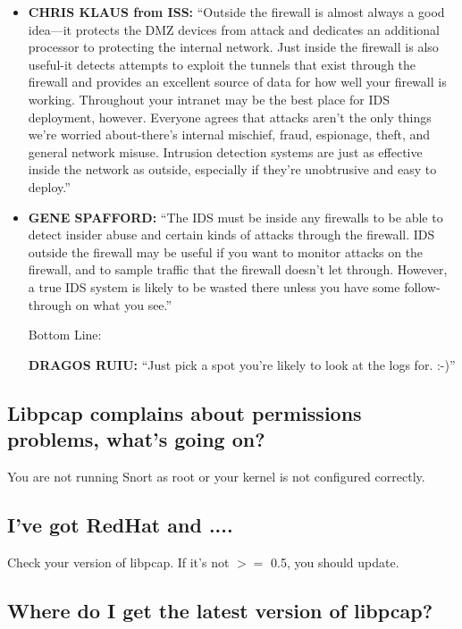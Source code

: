 \documentclass{article}
\begin{document}
\begin{itemize}
\item {\bf CHRIS KLAUS from ISS:} ``Outside the firewall is almost always a good
    idea---it protects the DMZ devices from attack and dedicates an additional
    processor to protecting the internal network. Just inside the firewall is
    also useful-it detects attempts to exploit the tunnels that exist through
    the firewall and provides an excellent source of data for how well your
    firewall is working. Throughout your intranet may be the best place for IDS
    deployment, however. Everyone agrees that attacks aren't the only things
    we're worried about-there's internal mischief, fraud, espionage, theft, and
    general network misuse. Intrusion detection systems are just as effective
    inside the network as outside, especially if they're unobtrusive and easy
    to deploy.''
    
\item {\bf GENE SPAFFORD:} ``The IDS must be inside any firewalls to be able to detect
    insider abuse and certain kinds of attacks through the firewall. IDS
    outside the firewall may be useful if you want to monitor attacks on the
    firewall, and to sample traffic that the firewall doesn't let through.
    However, a true IDS system is likely to be wasted there unless you have
    some follow-through on what you see.''
    
    \vspace{10pt}
   Bottom Line:

{\bf DRAGOS RUIU:} ``Just pick a spot you're likely to look at the logs for. :-)''

\end{itemize}
\subsection{Libpcap complains about permissions problems, what's going on?}

You are not running Snort as root or your kernel is not configured 
correctly.

\subsection{ I've got RedHat and ....}

Check your version of libpcap.  If it's not $>=$ 0.5, you should update.

\subsection{Where do I get the latest version of libpcap? }
\end{document}
